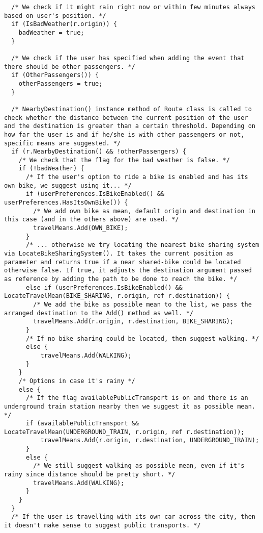 \begin{tcolorbox}
\begin{verbatim}
  /* We check if it might rain right now or within few minutes always based on user's position. */
  if (IsBadWeather(r.origin)) {
    badWeather = true;
  }

  /* We check if the user has specified when adding the event that there should be other passengers. */
  if (OtherPassengers()) {
    otherPassengers = true;
  }
  
  /* NearbyDestination() instance method of Route class is called to check whether the distance between the current position of the user and the destination is greater than a certain threshold. Depending on how far the user is and if he/she is with other passengers or not, specific means are suggested. */
  if (r.NearbyDestination() && !otherPassengers) {
    /* We check that the flag for the bad weather is false. */
    if (!badWeather) {
      /* If the user's option to ride a bike is enabled and has its own bike, we suggest using it... */
      if (userPreferences.IsBikeEnabled() && userPreferences.HasItsOwnBike()) {
        /* We add own bike as mean, default origin and destination in this case (and in the others above) are used. */
        travelMeans.Add(OWN_BIKE);
      }
      /* ... otherwise we try locating the nearest bike sharing system via LocateBikeSharingSystem(). It takes the current position as parameter and returns true if a near shared-bike could be located otherwise false. If true, it adjusts the destination argument passed as reference by adding the path to be done to reach the bike. */
      else if (userPreferences.IsBikeEnabled() && LocateTravelMean(BIKE_SHARING, r.origin, ref r.destination)) {
        /* We add the bike as possible mean to the list, we pass the arranged destination to the Add() method as well. */
        travelMeans.Add(r.origin, r.destination, BIKE_SHARING);
      }
      /* If no bike sharing could be located, then suggest walking. */
      else {
          travelMeans.Add(WALKING);
      }
    }
    /* Options in case it's rainy */
    else {
      /* If the flag availablePublicTransport is on and there is an underground train station nearby then we suggest it as possible mean. */
      if (availablePublicTransport && LocateTravelMean(UNDERGROUND_TRAIN, r.origin, ref r.destination));
          travelMeans.Add(r.origin, r.destination, UNDERGROUND_TRAIN);
      }
      else {
        /* We still suggest walking as possible mean, even if it's rainy since distance should be pretty short. */
        travelMeans.Add(WALKING);
      }
    }
  }
  /* If the user is travelling with its own car across the city, then it doesn't make sense to suggest public transports. */

\end{verbatim}
\end{tcolorbox}
